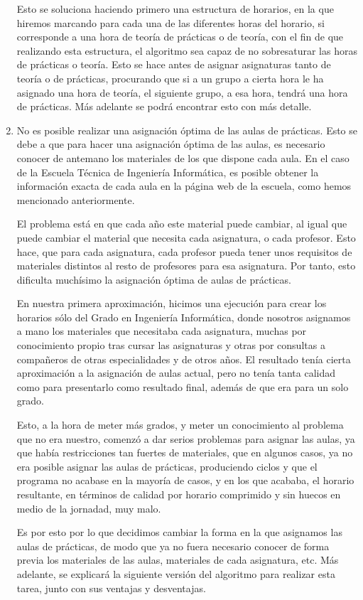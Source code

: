 \begin{enumerate}[---]
    Esto se soluciona haciendo primero una estructura de horarios, en la que hiremos marcando para cada una de las diferentes horas del horario, si corresponde a una hora de teoría de prácticas o de teoría, con el fin de que realizando esta estructura, el algoritmo sea capaz de no sobresaturar las horas de prácticas o teoría. Esto se hace antes de asignar asignaturas tanto de teoría o de prácticas, procurando que si a un grupo a cierta hora le ha asignado una hora de teoría, el siguiente grupo, a esa hora, tendrá una hora de prácticas. Más adelante se podrá encontrar esto con más detalle.

    \item No es posible realizar una asignación óptima de las aulas de prácticas. Esto se debe a que para hacer una asignación óptima de las aulas, es necesario conocer de antemano los materiales de los que dispone cada aula. En el caso de la Escuela Técnica de Ingeniería Informática, es posible obtener la información exacta de cada aula en la página web de la escuela, como hemos mencionado anteriormente.

    El problema está en que cada año este material puede cambiar, al igual que puede cambiar el material que necesita cada asignatura, o cada profesor. Esto hace, que para cada asignatura, cada profesor pueda tener unos requisitos de materiales distintos al resto de profesores para esa asignatura. Por tanto, esto dificulta muchísimo la asignación óptima de aulas de prácticas.

    En nuestra primera aproximación, hicimos una ejecución para crear los horarios sólo del Grado en Ingeniería Informática, donde nosotros asignamos a mano los materiales que necesitaba cada asignatura, muchas por conocimiento propio tras cursar las asignaturas y otras por consultas a compañeros de otras especialidades y de otros años. El resultado tenía cierta aproximación a la asignación de aulas actual, pero no tenía tanta calidad como para presentarlo como resultado final, además de que era para un solo grado. 

    Esto, a la hora de meter más grados, y meter un conocimiento al problema que no era nuestro, comenzó a dar serios problemas para asignar las aulas, ya que había restricciones tan fuertes de materiales, que en algunos casos, ya no era posible asignar las aulas de prácticas, produciendo ciclos y que el programa no acabase en la mayoría de casos, y en los que acababa, el horario resultante, en términos de calidad por horario comprimido y sin huecos en medio de la jornadad, muy malo. 

    Es por esto por lo que decidimos cambiar la forma en la que asignamos las aulas de prácticas, de modo que ya no fuera necesario conocer de forma previa los materiales de las aulas, materiales de cada asignatura, etc. Más adelante, se explicará la siguiente versión del algoritmo para realizar esta tarea, junto con sus ventajas y desventajas.

\end{enumerate}

